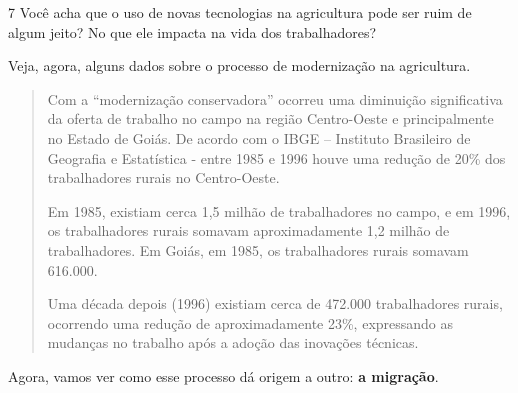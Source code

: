 \num{7} Você acha que o uso de novas tecnologias na agricultura pode ser ruim de
algum jeito? No que ele impacta na vida dos trabalhadores?


Veja, agora, alguns dados sobre o processo de modernização na agricultura.

\begin{quote}
Com a “modernização conservadora” ocorreu uma diminuição significativa
da oferta de trabalho no campo na região Centro-Oeste e principalmente
no Estado de Goiás. De acordo com o IBGE -- Instituto Brasileiro de
Geografia e Estatística - entre 1985 e 1996 houve uma redução de 20\%
dos trabalhadores rurais no Centro-Oeste.

Em 1985, existiam cerca 1,5 milhão de trabalhadores no campo, e em 1996,
os trabalhadores rurais somavam aproximadamente 1,2 milhão de
trabalhadores. Em Goiás, em 1985, os trabalhadores rurais somavam
616.000.

Uma década depois (1996) existiam cerca de 472.000 trabalhadores rurais,
ocorrendo uma redução de aproximadamente 23\%, expressando as mudanças
no trabalho após a adoção das inovações técnicas.

\end{quote}


Agora, vamos ver como esse processo dá origem a outro: \textbf{a migração}.


